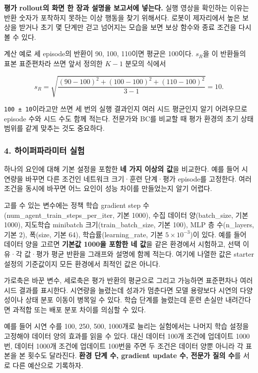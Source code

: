 \documentclass[11pt,a4paper]{article}
\begin{document}
\textbf{평가 rollout의 화면 한 장과 설명을 보고서에 넣는다.} 실행 영상을 확인하는 이유는 반환 숫자가 포착하지 못하는 이상 행동을 찾기 위해서다. 로봇이 제자리에서 높은 보상을 받거나 초기 몇 단계만 걷고 넘어지는 모습을 보면 보상 함수와 종료 조건을 다시 볼 수 있다.\par

계산 예로 세 episode의 반환이 90, 100, 110이면 평균은 100이다. $s_R$을 이 반환들의 표본 표준편차라 쓰면 앞서 정의한 $K-1$ 분모의 식에서\par

\[
s_R=\sqrt{\frac{(90-100)^2+(100-100)^2+(110-100)^2}{3-1}}=10.
\]

\texttt{100 ± 10}이라고만 쓰면 세 번의 실행 결과인지 여러 시드 평균인지 알기 어려우므로 episode 수와 시드 수도 함께 적는다. 전문가와 BC를 비교할 때 평가 환경의 초기 상태 범위를 같게 맞추는 것도 중요하다.\par

\subsubsection{4. 하이퍼파라미터 실험}

하나의 요인에 대해 기본 설정을 포함한 \textbf{네 가지 이상의 값}을 비교한다. 예를 들어 시연량을 바꾸면 다른 조건인 네트워크 크기·훈련 단계·평가 episode를 고정한다. 여러 조건을 동시에 바꾸면 어느 요인이 성능 차이를 만들었는지 알기 어렵다.\par

고를 수 있는 변수에는 정책 학습 gradient step 수(num\_agent\_train\_steps\_per\_iter, 기본 1000), 수집 데이터 양(batch\_size, 기본 1000), 지도학습 minibatch 크기(train\_batch\_size, 기본 100), MLP 층 수(n\_layers, 기본 2), 폭(size, 기본 64), 학습률(learning\_rate, 기본 $5\times10^{-3}$)이 있다. 예를 들어 데이터 양을 고르면 \textbf{기본값 1000을 포함한 네 값}을 같은 환경에서 시험하고, 선택 이유·각 값·평가 평균 반환을 그래프와 설명에 함께 적는다. 여기에 나열한 값은 starter 설정의 기준값이지 모든 환경에서 최적인 값은 아니다.\par

가로축은 바꾼 변수, 세로축은 평가 반환의 평균으로 그리고 가능하면 표준편차나 여러 시드 결과를 표시한다. 시연량을 늘렸는데 성과가 멈춘다면 모델 용량보다 시연의 다양성이나 상태 분포 이동이 병목일 수 있다. 학습 단계를 늘렸는데 훈련 손실만 내려간다면 과적합 또는 배포 분포 차이를 의심할 수 있다.\par

예를 들어 시연 수를 100, 250, 500, 1000개로 늘리는 실험에서는 나머지 학습 설정을 고정해야 데이터 양의 효과를 읽을 수 있다. 대신 데이터 100개 조건에 업데이트 1000번, 데이터 1000개 조건에 업데이트 100번을 주면 두 조건은 데이터 양뿐 아니라 각 표본을 본 횟수도 달라진다. \textbf{환경 단계 수, gradient update 수, 전문가 질의 수}를 서로 다른 예산으로 기록하자.\par
\end{document}

